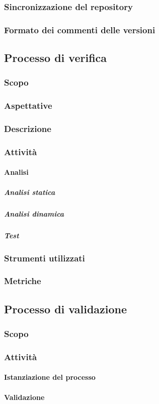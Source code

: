 \subsubsection{Sincronizzazione del repository} 

\subsubsection{Formato dei commenti delle versioni} 

\subsection{Processo di verifica}
\subsubsection{Scopo}

\subsubsection{Aspettative}

\subsubsection{Descrizione}

\subsubsection{Attività}
\paragraph{Analisi} 

\subparagraph{Analisi statica} 

\subparagraph{Analisi dinamica} 

\subparagraph{Test} 

\subsubsection{Strumenti utilizzati}

\subsubsection{Metriche}

\subsection{Processo di validazione}
\subsubsection{Scopo}

\subsubsection{Attività}
\paragraph{Istanziazione del processo} 

\paragraph{Validazione} 

